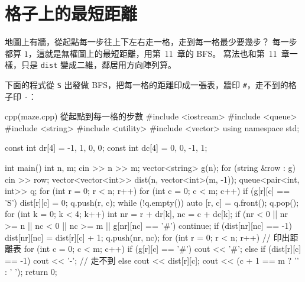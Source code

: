 \section{格子上的最短距離}
\label{sec:grid-bfs}

地圖上有牆，從起點每一步往上下左右走一格，走到每一格最少要幾步？ 每一步都算
$1$，這就是無權圖上的最短距離，用第~11~章的 BFS。 寫法也和第~11~章一樣，只是
\texttt{dist} 變成二維，鄰居用方向陣列算。

下面的程式從 \texttt{S} 出發做 BFS，把每一格的距離印成一張表，牆印
\texttt{\#}，走不到的格子印 \texttt{-}：

\begin{example}[label=ex:maze]{cpp}{(maze.cpp) 從起點到每一格的步數}
#include <iostream>
#include <queue>
#include <string>
#include <utility>
#include <vector>
using namespace std;

const int dr[4] = {-1, 1, 0, 0};
const int dc[4] = {0, 0, -1, 1};

int main() {
    int n, m;
    cin >> n >> m;
    vector<string> g(n);
    for (string &row : g) {
        cin >> row;
    }
    vector<vector<int>> dist(n, vector<int>(m, -1));
    queue<pair<int, int>> q;
    for (int r = 0; r < n; r++) {
        for (int c = 0; c < m; c++) {
            if (g[r][c] == 'S') {
                dist[r][c] = 0;
                q.push({r, c});
            }
        }
    }
    while (!q.empty()) {
        auto [r, c] = q.front();
        q.pop();
        for (int k = 0; k < 4; k++) {
            int nr = r + dr[k], nc = c + dc[k];
            if (nr < 0 || nr >= n || nc < 0 || nc >= m ||
                g[nr][nc] == '#') {
                continue;
            }
            if (dist[nr][nc] == -1) {
                dist[nr][nc] = dist[r][c] + 1;
                q.push({nr, nc});
            }
        }
    }
    for (int r = 0; r < n; r++) {             // 印出距離表
        for (int c = 0; c < m; c++) {
            if (g[r][c] == '#') {
                cout << '#';
            } else if (dist[r][c] == -1) {
                cout << '-';                  // 走不到
            } else {
                cout << dist[r][c];
            }
            cout << (c + 1 == m ? '\n' : ' ');
        }
    }
    return 0;
}
\end{example}


